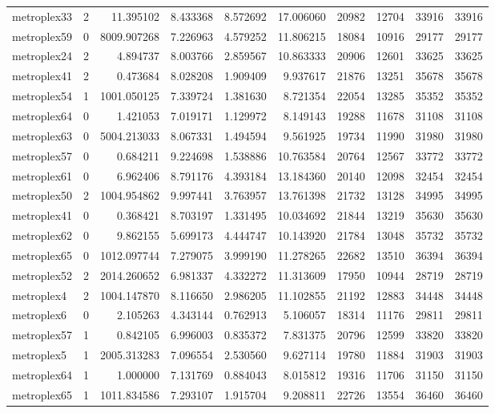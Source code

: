 \begin{longtable}{|l|r|r|r|r|r|r|r|r|r|}
metroplex33 & 2 & 11.395102 & 8.433368 & 8.572692 & 17.006060 & 20982 & 12704 & 33916 & 33916 \\
metroplex59 & 0 & 8009.907268 & 7.226963 & 4.579252 & 11.806215 & 18084 & 10916 & 29177 & 29177 \\
metroplex24 & 2 & 4.894737 & 8.003766 & 2.859567 & 10.863333 & 20906 & 12601 & 33625 & 33625 \\
metroplex41 & 2 & 0.473684 & 8.028208 & 1.909409 & 9.937617 & 21876 & 13251 & 35678 & 35678 \\
metroplex54 & 1 & 1001.050125 & 7.339724 & 1.381630 & 8.721354 & 22054 & 13285 & 35352 & 35352 \\
metroplex64 & 0 & 1.421053 & 7.019171 & 1.129972 & 8.149143 & 19288 & 11678 & 31108 & 31108 \\
metroplex63 & 0 & 5004.213033 & 8.067331 & 1.494594 & 9.561925 & 19734 & 11990 & 31980 & 31980 \\
metroplex57 & 0 & 0.684211 & 9.224698 & 1.538886 & 10.763584 & 20764 & 12567 & 33772 & 33772 \\
metroplex61 & 0 & 6.962406 & 8.791176 & 4.393184 & 13.184360 & 20140 & 12098 & 32454 & 32454 \\
metroplex50 & 2 & 1004.954862 & 9.997441 & 3.763957 & 13.761398 & 21732 & 13128 & 34995 & 34995 \\
metroplex41 & 0 & 0.368421 & 8.703197 & 1.331495 & 10.034692 & 21844 & 13219 & 35630 & 35630 \\
metroplex62 & 0 & 9.862155 & 5.699173 & 4.444747 & 10.143920 & 21784 & 13048 & 35732 & 35732 \\
metroplex65 & 0 & 1012.097744 & 7.279075 & 3.999190 & 11.278265 & 22682 & 13510 & 36394 & 36394 \\
metroplex52 & 2 & 2014.260652 & 6.981337 & 4.332272 & 11.313609 & 17950 & 10944 & 28719 & 28719 \\
metroplex4 & 2 & 1004.147870 & 8.116650 & 2.986205 & 11.102855 & 21192 & 12883 & 34448 & 34448 \\
metroplex6 & 0 & 2.105263 & 4.343144 & 0.762913 & 5.106057 & 18314 & 11176 & 29811 & 29811 \\
metroplex57 & 1 & 0.842105 & 6.996003 & 0.835372 & 7.831375 & 20796 & 12599 & 33820 & 33820 \\
metroplex5 & 1 & 2005.313283 & 7.096554 & 2.530560 & 9.627114 & 19780 & 11884 & 31903 & 31903 \\
metroplex64 & 1 & 1.000000 & 7.131769 & 0.884043 & 8.015812 & 19316 & 11706 & 31150 & 31150 \\
metroplex65 & 1 & 1011.834586 & 7.293107 & 1.915704 & 9.208811 & 22726 & 13554 & 36460 & 36460 \\

\end{longtable}
